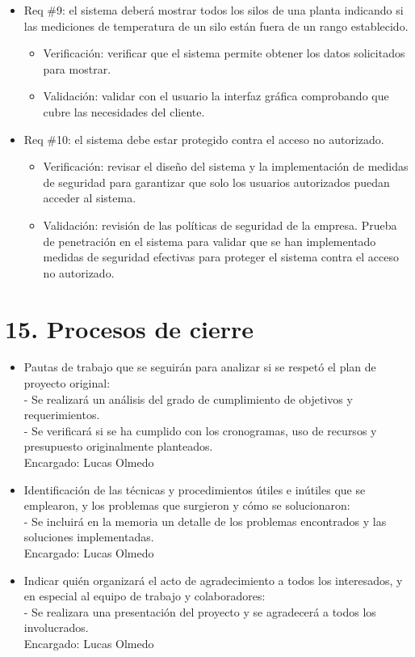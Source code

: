 \documentclass[
11pt, %
]{charter}
\begin{document}
\begin{itemize}
\item Req \#9: el sistema deberá mostrar todos los silos de una planta indicando si las mediciones
de temperatura de un silo están fuera de un rango establecido.
\begin{itemize}
	\item Verificación: verificar que el sistema permite obtener los datos solicitados para mostrar. 
	\item Validación: validar con el usuario la interfaz gráfica comprobando que cubre las necesidades del cliente. 
\end{itemize}

\item Req \#10: el sistema debe estar protegido contra el acceso no autorizado.
\begin{itemize}
	\item Verificación: revisar el diseño del sistema y la implementación de medidas de seguridad para garantizar que solo los usuarios autorizados puedan acceder al sistema.
	\item Validación: revisión de las políticas de seguridad de la empresa. Prueba de penetración en el sistema para validar que se han implementado medidas de seguridad efectivas para proteger el sistema contra el acceso no autorizado.
\end{itemize}

\end{itemize}



\section{15. Procesos de cierre}    
\label{sec:cierre}


\begin{itemize}
	\item Pautas de trabajo que se seguirán para analizar si se respetó el plan de proyecto original:\\
	 - Se realizará un análisis del grado de cumplimiento de objetivos y requerimientos.\\
	 - Se verificará si se ha cumplido con los cronogramas, uso de recursos y presupuesto
originalmente planteados.\\
	Encargado: Lucas Olmedo
	\item Identificación de las técnicas y procedimientos útiles e inútiles que se emplearon, y los problemas que surgieron y cómo se solucionaron:\\
	 - Se incluirá en la memoria un detalle de los problemas encontrados y las soluciones implementadas.\\
	Encargado: Lucas Olmedo
	\item Indicar quién organizará el acto de agradecimiento a todos los interesados, y en especial al equipo de trabajo y colaboradores:\\
	  - Se realizara una presentación del proyecto y se agradecerá a todos los involucrados.\\
	  Encargado: Lucas Olmedo\\
\end{itemize}
\end{document}
